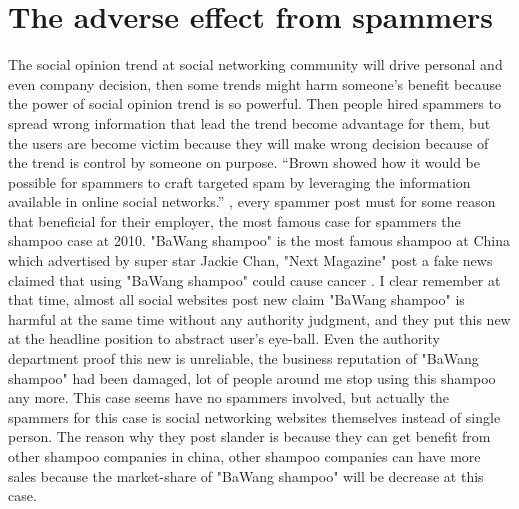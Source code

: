 \documentclass[sigconf]{acmart}
\begin{document}
\section{The adverse effect from spammers}
The social opinion trend at social networking community will drive personal and even company decision, then some trends might harm someone's benefit because the power of social opinion trend is so powerful. Then people hired spammers to spread wrong information that lead the trend become advantage for them, but the users are become victim because they will make wrong decision because of the trend is control by someone on purpose. ``Brown  showed how it would be possible for spammers to craft targeted spam by leveraging the information available in online social networks.'' \cite{adv:01}, every spammer post must for some reason that beneficial for their employer, the most famous case for spammers the shampoo case at 2010. "BaWang shampoo" is the most famous shampoo at China which advertised by super star Jackie Chan, "Next Magazine" post a fake news claimed that using "BaWang shampoo" could cause cancer \cite{bawang:01}. I clear remember at that time, almost all social websites post new claim "BaWang shampoo" is harmful at the same time without any authority judgment, and they put this new at the headline position to abstract user's eye-ball. Even the authority department proof this new is unreliable, the business reputation of "BaWang shampoo" had been damaged, lot of people around me stop using this shampoo any more. This case seems have no spammers involved, but actually the spammers for this case is social networking websites themselves instead of single person. The reason why they post slander is because they can get benefit from other shampoo companies in china, other shampoo companies can have more sales because the market-share of "BaWang shampoo" will be decrease at this case.
\end{document}

